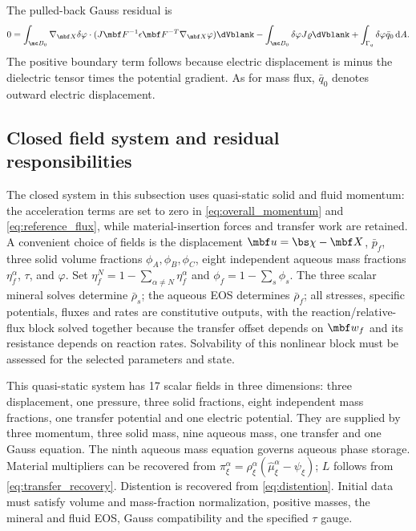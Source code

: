 \documentclass[11pt]{article}
\begin{document}
The pulled-back Gauss residual is
\begin{equation}
 0=\int_{\mc B_0}\nabla_{\mbf X}\delta\varphi\cdot
 (J\mbf F^{-1}\epsilon\mbf F^{-T}\nabla_{\mbf X}\varphi)\dVblank
 -\int_{\mc B_0}\delta\varphi J\varrho\dVblank
 +\int_{\Gamma_q}\delta\varphi\bar q_0\,{\rm d}A.
 \label{eq:weak_gauss}
\end{equation}
The positive boundary term follows because electric displacement is minus the dielectric tensor times the potential gradient. As for mass flux, \(\bar q_0\) denotes outward electric displacement.

\subsection{Closed field system and residual responsibilities}
The closed system in this subsection uses quasi-static solid and fluid momentum: the acceleration terms are set to zero in \eqref{eq:overall_momentum} and \eqref{eq:reference_flux}, while material-insertion forces and transfer work are retained. A convenient choice of fields is the displacement \(\mbf u=\bs\chi-\mbf X\), \(\bar p_f\), three solid volume fractions \(\phi_A,\phi_B,\phi_C\), eight independent aqueous mass fractions \(\eta_f^\alpha\), \(\tau\), and \(\varphi\). Set \(\eta_f^N=1-\sum_{\alpha\ne N}\eta_f^\alpha\) and \(\phi_f=1-\sum_s\phi_s\). The three scalar mineral solves determine \(\bar\rho_s\); the aqueous EOS determines \(\bar\rho_f\); all stresses, specific potentials, fluxes and rates are constitutive outputs, with the reaction/relative-flux block solved together because the transfer offset depends on \(\mbf w_f\) and its resistance depends on reaction rates. Solvability of this nonlinear block must be assessed for the selected parameters and state.

This quasi-static system has 17 scalar fields in three dimensions: three displacement, one pressure, three solid fractions, eight independent mass fractions, one transfer potential and one electric potential. They are supplied by three momentum, three solid mass, nine aqueous mass, one transfer and one Gauss equation. The ninth aqueous mass equation governs aqueous phase storage. Material multipliers can be recovered from \(\pi_\xi^\alpha=\rho_\xi^\alpha(\hat\mu_\xi^\alpha-\psi_\xi)\); \(L\) follows from \eqref{eq:transfer_recovery}. Distention is recovered from \eqref{eq:distention}. Initial data must satisfy volume and mass-fraction normalization, positive masses, the mineral and fluid EOS, Gauss compatibility and the specified \(\tau\) gauge.
\end{document}
